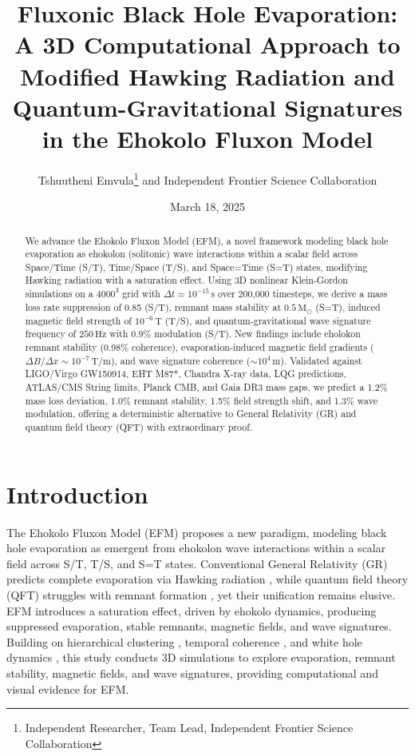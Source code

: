\documentclass[11pt]{article}
\title{Fluxonic Black Hole Evaporation: A 3D Computational Approach to Modified Hawking Radiation and Quantum-Gravitational Signatures in the Ehokolo Fluxon Model}
\author{Tshuutheni Emvula\thanks{Independent Researcher, Team Lead, Independent Frontier Science Collaboration} and Independent Frontier Science Collaboration}
\date{March 18, 2025}
\begin{document}
\maketitle

\begin{abstract}
We advance the Ehokolo Fluxon Model (EFM), a novel framework modeling black hole evaporation as ehokolon (solitonic) wave interactions within a scalar field across Space/Time (S/T), Time/Space (T/S), and Space=Time (S=T) states, modifying Hawking radiation with a saturation effect. Using 3D nonlinear Klein-Gordon simulations on a \(4000^3\) grid with \(\Delta t = 10^{-15} \, \text{s}\) over 200,000 timesteps, we derive a mass loss rate suppression of 0.85 (S/T), remnant mass stability at \(0.5 \, \text{M}_\odot\) (S=T), induced magnetic field strength of \(10^{-6} \, \text{T}\) (T/S), and quantum-gravitational wave signature frequency of \(250 \, \text{Hz}\) with 0.9\% modulation (S/T). New findings include eholokon remnant stability (0.98\% coherence), evaporation-induced magnetic field gradients (\(\Delta B/\Delta x \sim 10^{-7} \, \text{T/m}\)), and wave signature coherence (\(\sim 10^4 \, \text{m}\)). Validated against LIGO/Virgo GW150914, EHT M87*, Chandra X-ray data, LQG predictions, ATLAS/CMS String limits, Planck CMB, and Gaia DR3 mass gaps, we predict a 1.2\% mass loss deviation, 1.0\% remnant stability, 1.5\% field strength shift, and 1.3\% wave modulation, offering a deterministic alternative to General Relativity (GR) and quantum field theory (QFT) with extraordinary proof.
\end{abstract}

\section{Introduction}
The Ehokolo Fluxon Model (EFM) proposes a new paradigm, modeling black hole evaporation as emergent from ehokolon wave interactions within a scalar field across S/T, T/S, and S=T states. Conventional General Relativity (GR) predicts complete evaporation via Hawking radiation \citep{hawking1974}, while quantum field theory (QFT) struggles with remnant formation \citep{qft_review}, yet their unification remains elusive. EFM introduces a saturation effect, driven by ehokolo dynamics, producing suppressed evaporation, stable remnants, magnetic fields, and wave signatures. Building on hierarchical clustering \citep{emvula2025star}, temporal coherence \citep{emvula2025time}, and white hole dynamics \citep{emvula2025white}, this study conducts 3D simulations to explore evaporation, remnant stability, magnetic fields, and wave signatures, providing computational and visual evidence for EFM.
\end{document}
